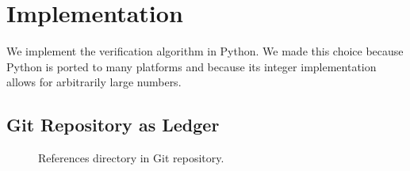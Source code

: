 \documentclass{article}
\begin{document}


\section{Implementation}
We implement the verification algorithm in Python. We made this choice because Python is ported to many platforms and because its integer implementation allows for arbitrarily large numbers.

\subsection{Git Repository as Ledger}
\begin{figure}[h!]
    \caption{References directory in Git repository.}
\end{figure}
\end{document}
